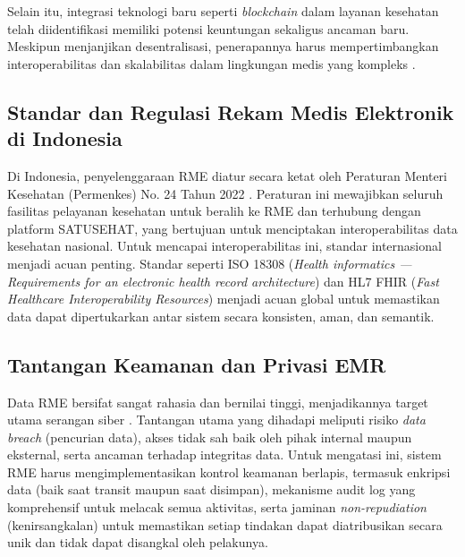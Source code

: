 Selain itu, integrasi teknologi baru seperti \textit{blockchain} dalam layanan kesehatan telah diidentifikasi memiliki potensi keuntungan sekaligus ancaman baru. Meskipun menjanjikan desentralisasi, penerapannya harus mempertimbangkan interoperabilitas dan skalabilitas dalam lingkungan medis yang kompleks \cite{1}.

\subsection{Standar dan Regulasi Rekam Medis Elektronik di Indonesia}
Di Indonesia, penyelenggaraan RME diatur secara ketat oleh Peraturan Menteri Kesehatan (Permenkes) No. 24 Tahun 2022 \cite{1}. Peraturan ini mewajibkan seluruh fasilitas pelayanan kesehatan untuk beralih ke RME dan terhubung dengan platform SATUSEHAT, yang bertujuan untuk menciptakan interoperabilitas data kesehatan nasional. Untuk mencapai interoperabilitas ini, standar internasional menjadi acuan penting. Standar seperti ISO 18308 (\textit{Health informatics — Requirements for an electronic health record architecture}) \cite{12} dan HL7 FHIR (\textit{Fast Healthcare Interoperability Resources}) \cite{11} menjadi acuan global untuk memastikan data dapat dipertukarkan antar sistem secara konsisten, aman, dan semantik.

\subsection{Tantangan Keamanan dan Privasi EMR}
Data RME bersifat sangat rahasia dan bernilai tinggi, menjadikannya target utama serangan siber \cite{17}. Tantangan utama yang dihadapi meliputi risiko \textit{data breach} (pencurian data), akses tidak sah baik oleh pihak internal maupun eksternal, serta ancaman terhadap integritas data. Untuk mengatasi ini, sistem RME harus mengimplementasikan kontrol keamanan berlapis, termasuk enkripsi data (baik saat transit maupun saat disimpan), mekanisme audit log yang komprehensif untuk melacak semua aktivitas, serta jaminan \textit{non-repudiation} (kenirsangkalan) untuk memastikan setiap tindakan dapat diatribusikan secara unik dan tidak dapat disangkal oleh pelakunya.